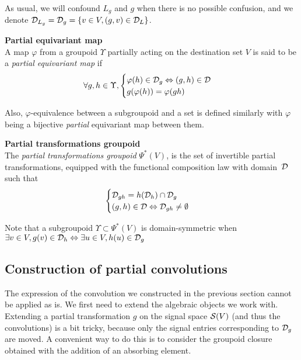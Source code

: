 \begin{remark}
As usual, we will confound $L_g$ and $g$ when there is no possible confusion, and we denote $\mathcal{D}_{L_g} = \mathcal{D}_g = \{ v \in V, (g,v) \in \mathcal{D}_L \}$.
\end{remark}

\begin{definition}\textbf{Partial equivariant map}\\
A map $\varphi$ from a groupoid $\Upsilon$ partially acting on the destination set $V$ is said to be a \emph{partial equivariant map} if
\begin{gather*}
\forall g,h \in \Upsilon,
  \begin{cases}
    \varphi(h) \in \mathcal{D}_g \Leftrightarrow (g,h) \in \mathcal{D}\\
    g(\varphi(h)) = \varphi(gh)
  \end{cases}
\end{gather*}
\end{definition}

Also, $\varphi$-equivalence between a subgroupoid and a set is defined similarly with $\varphi$ being a bijective \emph{partial} equivariant map between them.

\begin{definition}\textbf{Partial transformations groupoid}\\
The \emph{partial transformations groupoid} $\Psi^*(V)$, is the set of invertible partial transformations, equipped with the functional composition law with domain~$\mathcal{D}$ such that
\begin{gather*}
\begin{cases}
\mathcal{D}_{gh} = h(\mathcal{D}_h) \cap \mathcal{D}_g\\
(g,h) \in \mathcal{D} \Leftrightarrow \mathcal{D}_{gh} \neq \emptyset
\end{cases}
\end{gather*}
\end{definition}

\begin{remark}Note that a subgroupoid $\Upsilon \subset \Psi^*(V)$ is domain-symmetric when $\exists v \in V, g(v) \in \mathcal{D}_h \Leftrightarrow \exists u \in V, h(u) \in \mathcal{D}_g$
\end{remark}

\subsection{Construction of partial convolutions}

The expression of the convolution we constructed in the previous section cannot be applied as is. We first need to extend the algebraic objects we work with. 
Extending a partial transformation $g$ on the signal space $\mathcal{S}(V)$ (and thus the convolutions) is a bit tricky, because only the signal entries corresponding to $\mathcal{D}_g$ are moved. A convenient way to do this is to consider the groupoid closure obtained with the addition of an absorbing element.


